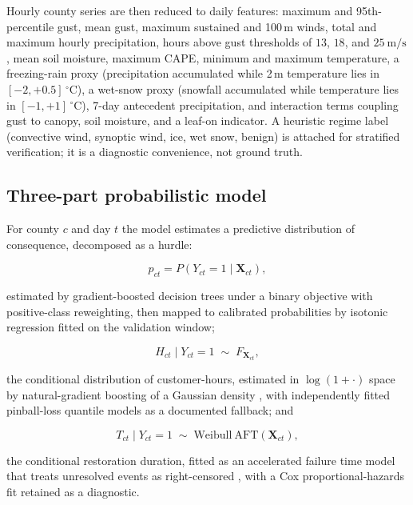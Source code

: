 \documentclass[10pt,twocolumn,letterpaper]{article}
\newcommand{\CH}{customer-hours}
\begin{document}
Hourly county series are then reduced to daily features: maximum and
95th-percentile gust, mean gust, maximum sustained and 100\,m winds, total and
maximum hourly precipitation, hours above gust thresholds of $13$, $18$, and
$\SI{25}{\meter\per\second}$, mean soil moisture, maximum CAPE, minimum and
maximum temperature, a freezing-rain proxy (precipitation accumulated while 2\,m
temperature lies in $[-2,+0.5]\,^\circ$C), a wet-snow proxy (snowfall
accumulated while temperature lies in $[-1,+1]\,^\circ$C), 7-day antecedent
precipitation, and interaction terms coupling gust to canopy, soil moisture, and
a leaf-on indicator. A heuristic regime label (convective wind, synoptic wind,
ice, wet snow, benign) is attached for stratified verification; it is a
diagnostic convenience, not ground truth.

\subsection{Three-part probabilistic model}

For county $c$ and day $t$ the model estimates a predictive distribution of
consequence, decomposed as a hurdle:

\begin{equation}
p_{ct} = P\!\left(Y_{ct}=1 \mid \mathbf{X}_{ct}\right),
\label{eq:occ}
\end{equation}

\noindent estimated by gradient-boosted decision trees
\citep{friedman2001gbm,ke2017lightgbm} under a binary objective with
positive-class reweighting, then mapped to calibrated probabilities by isotonic
regression \citep{zadrozny2002calibration} fitted on the validation window;

\begin{equation}
H_{ct} \mid Y_{ct}=1 \;\sim\; F_{\mathbf{X}_{ct}},
\label{eq:mag}
\end{equation}

\noindent the conditional distribution of \CH{}, estimated in $\log(1+\cdot)$
space by natural-gradient boosting of a Gaussian density
\citep{duan2020ngboost}, with independently fitted pinball-loss quantile models
as a documented fallback; and

\begin{equation}
T_{ct} \mid Y_{ct}=1 \;\sim\; \mathrm{Weibull\ AFT}(\mathbf{X}_{ct}),
\label{eq:dur}
\end{equation}

\noindent the conditional restoration duration, fitted as an accelerated failure
time model that treats unresolved events as right-censored
\citep{kalbfleisch2002failuretime}, with a Cox proportional-hazards fit retained
as a diagnostic.
\end{document}
